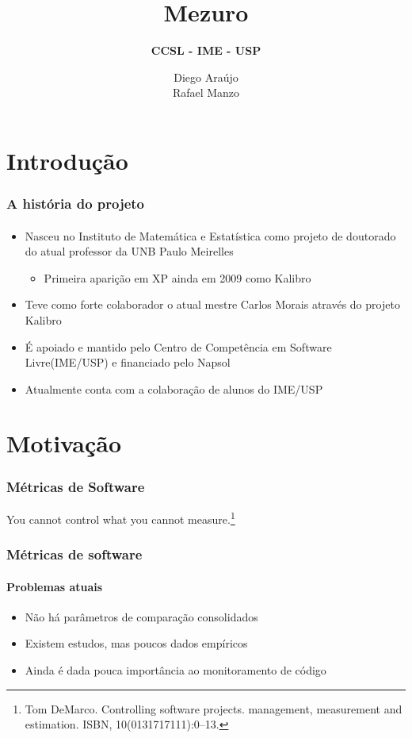 \documentclass{beamer}
\title{
       \textbf{Mezuro} \\
      }
\subtitle{
		\textbf{CCSL - IME - USP}
		}
\author{Diego Araújo\\
        Rafael Manzo
       }
\begin{document}
\maketitle

\section{Introdução}

\begin{frame}
  \frametitle{A história do projeto}
  \framesubtitle{}

  \begin{itemize}
    \item Nasceu no Instituto de Matemática e Estatística como projeto de doutorado do atual professor da UNB Paulo Meirelles
      \begin{itemize}
        \item Primeira aparição em XP ainda em 2009 como Kalibro
      \end{itemize}
    \item Teve como forte colaborador o atual mestre Carlos Morais através do projeto Kalibro
    \item É apoiado e mantido pelo Centro de Competência em Software Livre(IME/USP) e financiado pelo Napsol
    \item Atualmente conta com a colaboração de alunos do IME/USP

  \end{itemize}

\end{frame}

\section{Motivação}
\begin{frame}

  \frametitle{Métricas de Software}
  \begin{center}
  You cannot control what you cannot measure.\footnote{Tom DeMarco. Controlling software projects. management, measurement and estimation. ISBN, 10(0131717111):0–13.}
  \end{center}


\end{frame}


\begin{frame}
  \frametitle{Métricas de software}
  \framesubtitle{Problemas atuais}

  \begin{itemize}
    \item Não há parâmetros de comparação consolidados
    \item Existem estudos, mas poucos dados empíricos
    \item Ainda é dada pouca importância ao monitoramento de código
  \end{itemize}
\end{frame}
\end{document}
